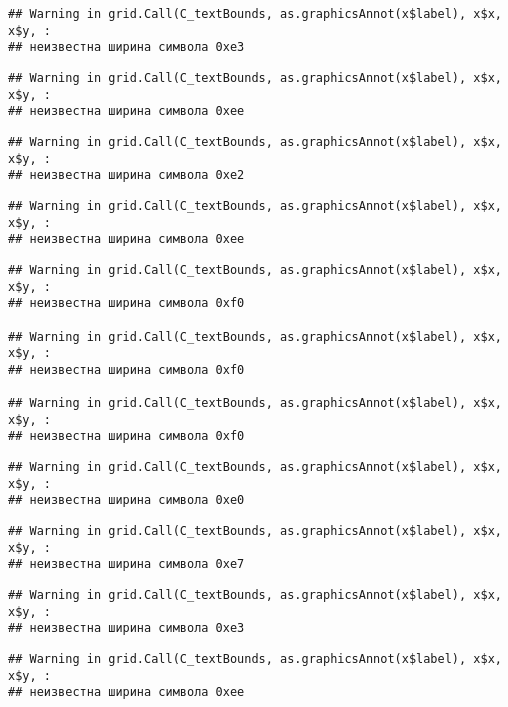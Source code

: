 \documentclass[
]{article}
\begin{document}
\begin{verbatim}
## Warning in grid.Call(C_textBounds, as.graphicsAnnot(x$label), x$x, x$y, :
## неизвестна ширина символа 0xe3
\end{verbatim}

\begin{verbatim}
## Warning in grid.Call(C_textBounds, as.graphicsAnnot(x$label), x$x, x$y, :
## неизвестна ширина символа 0xee
\end{verbatim}

\begin{verbatim}
## Warning in grid.Call(C_textBounds, as.graphicsAnnot(x$label), x$x, x$y, :
## неизвестна ширина символа 0xe2
\end{verbatim}

\begin{verbatim}
## Warning in grid.Call(C_textBounds, as.graphicsAnnot(x$label), x$x, x$y, :
## неизвестна ширина символа 0xee
\end{verbatim}

\begin{verbatim}
## Warning in grid.Call(C_textBounds, as.graphicsAnnot(x$label), x$x, x$y, :
## неизвестна ширина символа 0xf0

## Warning in grid.Call(C_textBounds, as.graphicsAnnot(x$label), x$x, x$y, :
## неизвестна ширина символа 0xf0

## Warning in grid.Call(C_textBounds, as.graphicsAnnot(x$label), x$x, x$y, :
## неизвестна ширина символа 0xf0
\end{verbatim}

\begin{verbatim}
## Warning in grid.Call(C_textBounds, as.graphicsAnnot(x$label), x$x, x$y, :
## неизвестна ширина символа 0xe0
\end{verbatim}

\begin{verbatim}
## Warning in grid.Call(C_textBounds, as.graphicsAnnot(x$label), x$x, x$y, :
## неизвестна ширина символа 0xe7
\end{verbatim}

\begin{verbatim}
## Warning in grid.Call(C_textBounds, as.graphicsAnnot(x$label), x$x, x$y, :
## неизвестна ширина символа 0xe3
\end{verbatim}

\begin{verbatim}
## Warning in grid.Call(C_textBounds, as.graphicsAnnot(x$label), x$x, x$y, :
## неизвестна ширина символа 0xee
\end{verbatim}
\end{document}
